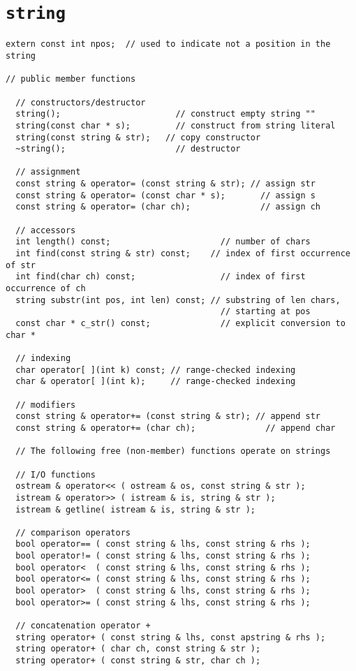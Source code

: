 \section{{\tt string}}

\begin{verbatim}
extern const int npos;  // used to indicate not a position in the string

// public member functions

  // constructors/destructor
  string();                       // construct empty string ""
  string(const char * s);         // construct from string literal
  string(const string & str);   // copy constructor
  ~string();                      // destructor

  // assignment
  const string & operator= (const string & str); // assign str
  const string & operator= (const char * s);       // assign s
  const string & operator= (char ch);              // assign ch

  // accessors
  int length() const;                      // number of chars
  int find(const string & str) const;    // index of first occurrence of str
  int find(char ch) const;                 // index of first occurrence of ch
  string substr(int pos, int len) const; // substring of len chars, 
                                           // starting at pos
  const char * c_str() const;              // explicit conversion to char *

  // indexing
  char operator[ ](int k) const; // range-checked indexing
  char & operator[ ](int k);     // range-checked indexing

  // modifiers
  const string & operator+= (const string & str); // append str
  const string & operator+= (char ch);              // append char

  // The following free (non-member) functions operate on strings

  // I/O functions
  ostream & operator<< ( ostream & os, const string & str );
  istream & operator>> ( istream & is, string & str );
  istream & getline( istream & is, string & str );

  // comparison operators
  bool operator== ( const string & lhs, const string & rhs );
  bool operator!= ( const string & lhs, const string & rhs );
  bool operator<  ( const string & lhs, const string & rhs );
  bool operator<= ( const string & lhs, const string & rhs );
  bool operator>  ( const string & lhs, const string & rhs );
  bool operator>= ( const string & lhs, const string & rhs );

  // concatenation operator +
  string operator+ ( const string & lhs, const apstring & rhs );
  string operator+ ( char ch, const string & str );
  string operator+ ( const string & str, char ch );
\end{verbatim}

